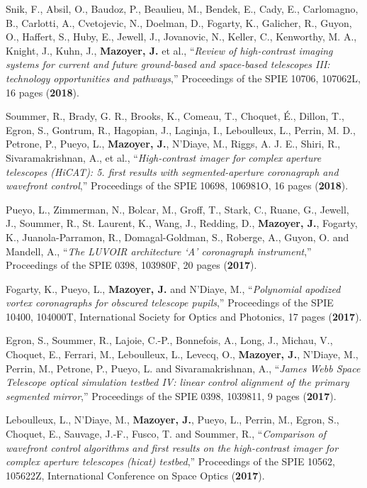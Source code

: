 \documentclass[11pt,a4paper, french]{article}
\begin{document}
\begin{etaremune}
\item Snik, F., Absil, O., Baudoz, P., Beaulieu, M., Bendek, E., Cady, E., Carlomagno, B., Carlotti, A., Cvetojevic, N., Doelman, D., Fogarty, K., Galicher, R., Guyon, O., Haffert, S., Huby, E., Jewell, J., Jovanovic, N., Keller, C., Kenworthy, M. A.,  Knight, J., Kuhn, J., \textbf{Mazoyer, J.} et al., “\textit{Review of high-contrast imaging systems for current and future ground-based and space-based telescopes III: technology opportunities and pathways},” Proceedings of the SPIE 10706, 107062L, 16 pages (\textbf{2018}).
\item Soummer, R., Brady, G. R., Brooks, K., Comeau, T., Choquet, É., Dillon, T., Egron, S., Gontrum, R., Hagopian, J., Laginja, I., Leboulleux, L., Perrin, M. D., Petrone, P., Pueyo, L., \textbf{Mazoyer, J.}, N’Diaye, M., Riggs, A. J. E., Shiri, R., Sivaramakrishnan, A., et al., “\textit{High-contrast imager for complex aperture telescopes (HiCAT): 5. first results with segmented-aperture coronagraph and wavefront control},” Proceedings of the SPIE 10698, 106981O, 16 pages (\textbf{2018}).
\item Pueyo, L., Zimmerman, N., Bolcar, M., Groff, T., Stark, C., Ruane, G., Jewell, J., Soummer, R., St. Laurent, K., Wang, J., Redding, D., \textbf{Mazoyer, J.}, Fogarty, K., Juanola-Parramon, R., Domagal-Goldman, S., Roberge, A., Guyon, O. and Mandell, A., “\textit{The LUVOIR architecture ‘A’ coronagraph instrument},” Proceedings of the SPIE 0398, 103980F, 20 pages (\textbf{2017}).
\item Fogarty, K., Pueyo, L., \textbf{Mazoyer, J.} and N’Diaye, M., “\textit{Polynomial apodized vortex coronagraphs for obscured telescope pupils},” Proceedings of the SPIE 10400, 104000T, International Society for Optics and Photonics, 17 pages (\textbf{2017}).
\item Egron, S., Soummer, R., Lajoie, C.-P., Bonnefois, A., Long, J., Michau, V., Choquet, E., Ferrari, M., Leboulleux, L., Levecq, O., \textbf{Mazoyer, J.}, N’Diaye, M., Perrin, M., Petrone, P., Pueyo, L. and Sivaramakrishnan, A., “\textit{James Webb Space Telescope optical simulation testbed IV: linear control alignment of the primary segmented mirror},” Proceedings of the SPIE 0398, 1039811, 9 pages (\textbf{2017}).
\item Leboulleux, L., N’Diaye, M., \textbf{Mazoyer, J.}, Pueyo, L., Perrin, M., Egron, S., Choquet, E., Sauvage, J.-F., Fusco, T. and Soummer, R., “\textit{Comparison of wavefront control algorithms and first results on the high-contrast imager for complex aperture telescopes (hicat) testbed},” Proceedings of the SPIE 10562, 105622Z, International Conference on Space Optics (\textbf{2017}).

\end{etaremune}
\end{document}
